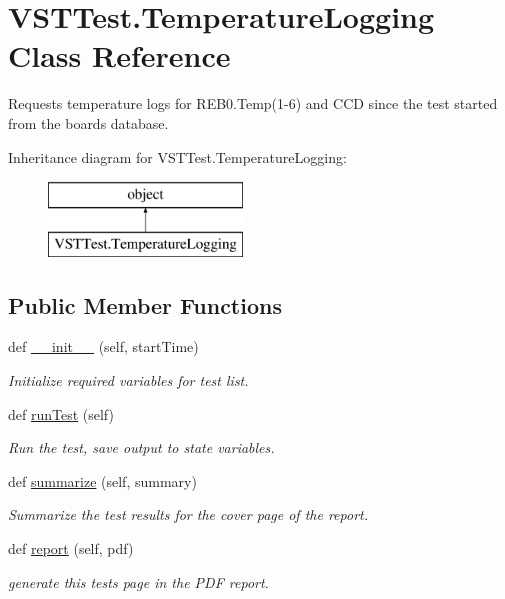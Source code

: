 \hypertarget{class_v_s_t_test_1_1_temperature_logging}{}\section{V\+S\+T\+Test.\+Temperature\+Logging Class Reference}
\label{class_v_s_t_test_1_1_temperature_logging}


Requests temperature logs for R\+E\+B0.\+Temp(1-\/6) and C\+CD since the test started from the board\textquotesingle{}s database.  


Inheritance diagram for V\+S\+T\+Test.\+Temperature\+Logging\+:\begin{figure}[H]
\begin{center}
\leavevmode
\includegraphics[height=2.000000cm]{class_v_s_t_test_1_1_temperature_logging}
\end{center}
\end{figure}
\subsection*{Public Member Functions}
\begin{DoxyCompactItemize}
\item 
def \hyperlink{class_v_s_t_test_1_1_temperature_logging_a5c3cf0fa22c85a81049c699e1837525a}{\+\_\+\+\_\+init\+\_\+\+\_\+} (self, start\+Time)
\begin{DoxyCompactList}\small\item\em Initialize required variables for test list. \end{DoxyCompactList}\item 
def \hyperlink{class_v_s_t_test_1_1_temperature_logging_a96c572238081070b22dfaeda6a9ecab9}{run\+Test} (self)
\begin{DoxyCompactList}\small\item\em Run the test, save output to state variables. \end{DoxyCompactList}\item 
def \hyperlink{class_v_s_t_test_1_1_temperature_logging_a522cf4079236462e82c078a194526a93}{summarize} (self, summary)
\begin{DoxyCompactList}\small\item\em Summarize the test results for the cover page of the report. \end{DoxyCompactList}\item 
def \hyperlink{class_v_s_t_test_1_1_temperature_logging_acee043694f538acce563360a262e79c2}{report} (self, pdf)
\begin{DoxyCompactList}\small\item\em generate this test\textquotesingle{}s page in the P\+DF report. \end{DoxyCompactList}\end{DoxyCompactItemize}



